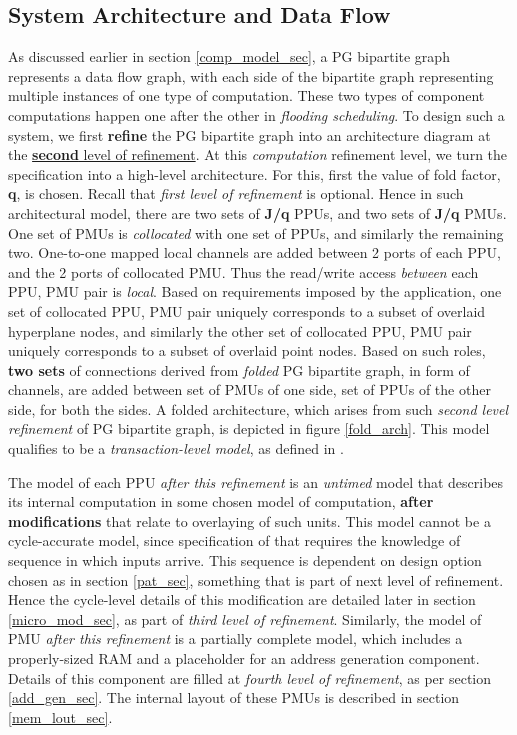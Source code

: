 \documentclass[12pt]{article}
\begin{document}
\subsection{System Architecture and Data Flow}
\label{sys_arch}
As discussed earlier in section \ref{comp_model_sec}, a PG bipartite graph
represents a data flow graph, with each side of the bipartite graph
representing multiple instances of one type of computation. These
two types of component computations happen one after the other in
\textit{flooding scheduling}.  To design such a system, we first
\textbf{refine} the PG bipartite graph into an architecture diagram at the
\uline{\textbf{second} level of refinement}.  At this \textit{computation}
refinement level, we turn the specification into a high-level architecture.
For this, first the value of fold factor, \textbf{q}, is chosen.
Recall that \textit{first level of refinement} is optional. Hence in such
architectural model, there
are two sets of \textbf{J/q} PPUs, and two sets of
\textbf{J/q} PMUs. One set of PMUs
is \textit{collocated} with one set of PPUs, and similarly the
remaining two. One-to-one mapped local channels are added between 2 ports
of each PPU, and the 2 ports of collocated PMU. Thus the
read/write access \textit{between} each PPU, PMU pair is \textit{local}.
Based on requirements imposed by the application, one set of
collocated PPU, PMU pair uniquely
corresponds to a subset of overlaid hyperplane nodes, and similarly the
other set of collocated PPU, PMU
pair uniquely corresponds to a subset of overlaid point nodes.
Based on such roles, \textbf{two sets} of connections derived from
\textit{folded} PG bipartite graph, in form of channels, are added between
set of PMUs of one side, set of PPUs of the other side,
for both the sides. A folded architecture, which arises from
such \textit{second level refinement} of PG
bipartite graph, is depicted in figure \ref{fold_arch}.
This model qualifies to be a \textit{transaction-level model}, as
defined in \cite{gajski_tlm_pap}.

The model of each PPU \textit{after this refinement}
is an \textit{untimed} model that describes its internal computation
in some chosen model of computation, \textbf{after
modifications} that relate to overlaying of such units. This model
cannot be a cycle-accurate model, since
specification of that requires the knowledge of sequence in which inputs
arrive. This sequence is dependent on design option chosen as in section
\ref{pat_sec}, something that is part of next level of refinement.
Hence the cycle-level details of this modification are detailed later in
section \ref{micro_mod_sec}, as part of \textit{third level of
refinement}.
Similarly, the model of PMU \textit{after this refinement} is a
partially complete model, which includes a properly-sized RAM and a
placeholder for an address generation component. Details of this component
are filled at \textit{fourth level of refinement}, as per section \ref{add_gen_sec}.
The internal layout of these PMUs is described in section \ref{mem_lout_sec}.
\end{document}

